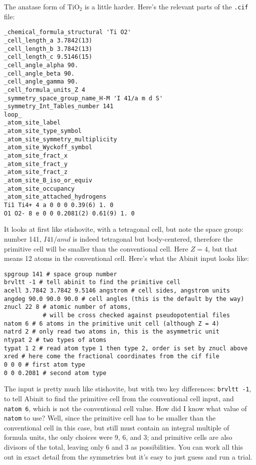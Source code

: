 \documentclass{article}
\begin{document}
The anatase form of TiO$_2$ is a little harder. Here's the relevant parts of the {\tt .cif} file:
\begin{verbatim}
_chemical_formula_structural 'Ti O2'
_cell_length_a 3.7842(13)
_cell_length_b 3.7842(13)
_cell_length_c 9.5146(15)
_cell_angle_alpha 90.
_cell_angle_beta 90.
_cell_angle_gamma 90.
_cell_formula_units_Z 4
_symmetry_space_group_name_H-M 'I 41/a m d S'
_symmetry_Int_Tables_number 141
loop_
_atom_site_label
_atom_site_type_symbol
_atom_site_symmetry_multiplicity
_atom_site_Wyckoff_symbol
_atom_site_fract_x
_atom_site_fract_y
_atom_site_fract_z
_atom_site_B_iso_or_equiv
_atom_site_occupancy
_atom_site_attached_hydrogens
Ti1 Ti4+ 4 a 0 0 0 0.39(6) 1. 0
O1 O2- 8 e 0 0 0.2081(2) 0.61(9) 1. 0
\end{verbatim}
It looks at first like stishovite, with a tetragonal cell, but note the space group:
number 141, $I 41/amd$ is indeed tetragonal but body-centered, therefore the primitive cell
will be smaller than the conventional cell. Here $Z = 4$, but that means 12 atoms in the conventional
cell. Here's what the {\sc Abinit} input looks like:
\begin{verbatim}
spgroup 141 # space group number
brvltt -1 # tell abinit to find the primitive cell
acell 3.7842 3.7842 9.5146 angstrom # cell sides, angstrom units
angdeg 90.0 90.0 90.0 # cell angles (this is the default by the way)
znucl 22 8 # atomic number of atoms, 
           # will be cross checked against pseudopotential files
natom 6 # 6 atoms in the primitive unit cell (although Z = 4)
natrd 2 # only read two atoms in, this is the asymmetric unit
ntypat 2 # two types of atoms
typat 1 2 # read atom type 1 then type 2, order is set by znucl above
xred # here come the fractional coordinates from the cif file
0 0 0 # first atom type
0 0 0.2081 # second atom type
\end{verbatim}
The input is pretty much like stishovite, but with two key differences: {\tt brvltt -1}, to tell {\sc Abinit}
to find the primitive cell from the conventional cell input, and {\tt natom 6}, which is not the conventional
cell value. How did I know what value of {\tt natom} to use? Well, since the primitive cell has to be smaller than
the conventional cell in this case, but still must contain an integral multiple of formula units, the only
choices were 9, 6, and 3; and primitive cells are also divisors of the total, leaving only 6 and 3 as possibilities. 
You can work all this out in exact detail from the symmetries but it's easy to just guess and run a trial. 
\end{document}
